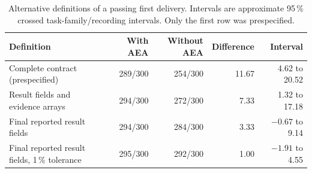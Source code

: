 \begin{table}[!htbp]
\centering\small
\caption{Alternative definitions of a passing first delivery. Intervals are approximate 95\,\% crossed task-family/recording intervals. Only the first row was prespecified.}
\label{tab:paired-composition}
\begin{tabular}{>{\raggedright\arraybackslash}p{6.4cm}rrrr}
\toprule
Definition & With AEA & Without AEA & Difference & Interval \\
\midrule
Complete contract (prespecified) & 289/300 & 254/300 & 11.67 & 4.62 to 20.52 \\
Result fields and evidence arrays & 294/300 & 272/300 & 7.33 & 1.32 to 17.18 \\
Final reported result fields & 294/300 & 284/300 & 3.33 & \(-0.67\) to 9.14 \\
Final reported result fields, 1\,\% tolerance & 295/300 & 292/300 & 1.00 & \(-1.91\) to 4.55 \\
\bottomrule
\end{tabular}
\end{table}
